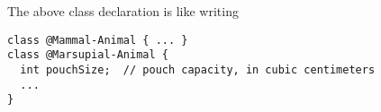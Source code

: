 The above class declaration is like writing

\begin{Verbatim}
class @Mammal-Animal { ... }
class @Marsupial-Animal {
  int pouchSize;  // pouch capacity, in cubic centimeters
  ...
}  
\end{Verbatim}


% 
% 
% 
% 
% 
% 
% 
% 
